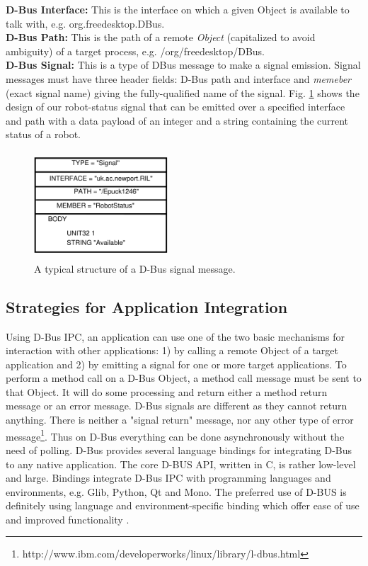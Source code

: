 \documentclass[draft]{ifacconf}
\begin{document}
\textbf{D-Bus Interface: }
This is the interface on which a given Object is available to talk with, e.g. org.freedesktop.DBus.\\
\textbf{D-Bus Path: }
This is the path of a remote \textit{Object} (capitalized to avoid ambiguity) of a target process, e.g. /org/freedesktop/DBus.\\
\textbf{D-Bus Signal: }
This is a type of DBus message to make a signal emission. Signal messages must have three header fields: D-Bus path and interface and {\em memeber} (exact signal name) giving the fully-qualified name of the signal. Fig. \ref{fig:dbus-signal-protocol}  shows the design of our robot-status signal that can be emitted over a specified interface and path with a data payload of an integer and a string containing the current status of a robot.
\begin{figure}
\begin{center}
\includegraphics[width=5cm,height=4cm]{./dia-files/dbus-signal-protocol} %
\caption{A typical structure of a D-Bus signal message.} 
\label{fig:dbus-signal-protocol}
\end{center}
\end{figure}
\subsection{Strategies for Application Integration}
Using D-Bus IPC, an application can use one of the two basic mechanisms for interaction with other applications: 1) by calling a remote Object of a target application and 2) by emitting a signal for one or more target applications. To perform a method call on a D-Bus Object, a method call message must be sent to that Object. It will do some processing and return either a method return message or an error message. D-Bus signals are different as they cannot return anything. There is neither a "signal return" message, nor any other type of error message\footnote{http://www.ibm.com/developerworks/linux/library/l-dbus.html}. Thus on D-Bus everything can be done asynchronously without the need of polling.
D-Bus provides several language bindings for integrating D-Bus to any native application. The core D-BUS API, written in C, is rather low-level and large. Bindings integrate D-Bus IPC with programming languages and environments, e.g. Glib, Python, Qt and Mono. The preferred use of D-BUS is definitely using language and environment-specific binding which offer ease of use and improved functionality \citep{Love2005}.
\end{document}
